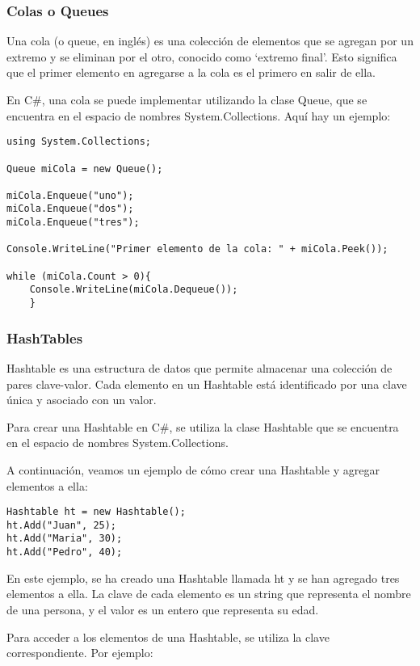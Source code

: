 \documentclass[executivepaper]{article}
\begin{document}
\subsubsection*{Colas o Queues}
Una cola (o queue, en inglés) es una colección de elementos que se agregan por un extremo y se eliminan por el otro, conocido como \enquote*{extremo final}. Esto significa que el primer elemento en agregarse a la cola es el primero en salir de ella.

En C\#, una cola se puede implementar utilizando la clase Queue, que se encuentra en el espacio de nombres System.Collections. Aquí hay un ejemplo:

\begin{lstlisting}
using System.Collections;

Queue miCola = new Queue();

miCola.Enqueue("uno");
miCola.Enqueue("dos");
miCola.Enqueue("tres");

Console.WriteLine("Primer elemento de la cola: " + miCola.Peek());

while (miCola.Count > 0){
    Console.WriteLine(miCola.Dequeue());
    }
\end{lstlisting}

\subsubsection*{HashTables}

Hashtable es una estructura de datos que permite almacenar una colección de pares clave-valor. Cada elemento en un Hashtable está identificado por una clave única y asociado con un valor.

Para crear una Hashtable en C\#, se utiliza la clase Hashtable que se encuentra en el espacio de nombres System.Collections.

A continuación, veamos un ejemplo de cómo crear una Hashtable y agregar elementos a ella:

\begin{lstlisting}
Hashtable ht = new Hashtable();
ht.Add("Juan", 25);
ht.Add("Maria", 30);
ht.Add("Pedro", 40);
\end{lstlisting}

En este ejemplo, se ha creado una Hashtable llamada ht y se han agregado tres elementos a ella. La clave de cada elemento es un string que representa el nombre de una persona, y el valor es un entero que representa su edad.

Para acceder a los elementos de una Hashtable, se utiliza la clave correspondiente. Por ejemplo:
\end{document}

